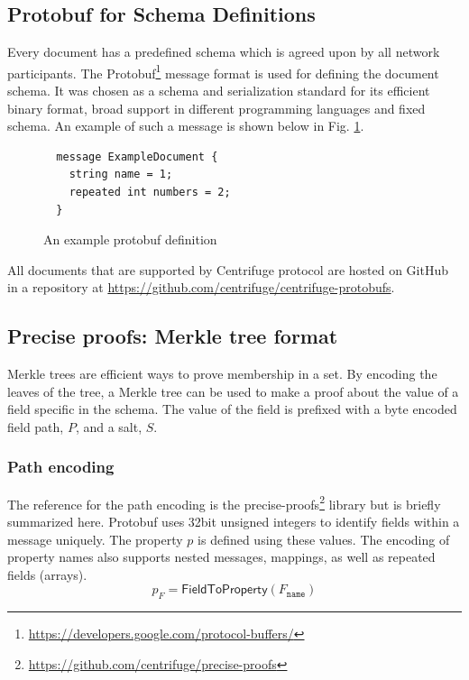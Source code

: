 \subsection{Protobuf for Schema Definitions}
Every document has a predefined schema which is agreed upon by all network participants. The Protobuf\footnote{\url{https://developers.google.com/protocol-buffers/}} message format is used for defining the document schema. It was chosen as a schema and serialization standard for its efficient binary format, broad support in different programming languages and fixed schema. An example of such a message is shown below in Fig. \ref{fig:example_document}. 

\begin{figure}[ht]
  \caption{An example protobuf definition}
  \label{fig:example_document}
  \begin{lstlisting}
  message ExampleDocument {
    string name = 1;
    repeated int numbers = 2;
  }\end{lstlisting}
\end{figure}

All documents that are supported by Centrifuge protocol are hosted on GitHub in a repository at \url{https://github.com/centrifuge/centrifuge-protobufs}.  



\subsection{Precise proofs: Merkle tree format}\label{sec:precise_proofs}
Merkle trees are efficient ways to prove membership in a set. By encoding the leaves of the tree, a Merkle tree can be used to make a proof about the value of a field specific in the schema. The value of the field is prefixed with a byte encoded field path, $P$, and a salt, $S$. 


\subsubsection{Path encoding}
The reference for the path encoding is the precise-proofs\footnote{\url{https://github.com/centrifuge/precise-proofs}} library but is briefly summarized here. Protobuf uses 32bit unsigned integers to identify fields within a message uniquely. The property $p$ is defined using these values. The encoding of property names also supports nested messages, mappings, as well as repeated fields (arrays). 
\begin{equation}
    p_{F} = \mathsf{FieldToProperty}(F_{\texttt{name}})
\end{equation}

